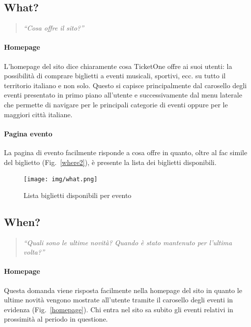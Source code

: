 \subsection{What?}
	\begin{quote}
		\emph{``Cosa offre il sito?''}
	\end{quote}
	\paragraph{Homepage}
		L'homepage del sito dice chiaramente cosa TicketOne offre ai suoi utenti: la possibilità di comprare biglietti a eventi musicali, sportivi, ecc. su tutto il territorio italiano e non solo.
		Questo si capisce principalmente dal carosello degli eventi presentato in primo piano all'utente e successivamente dal menu laterale che permette di navigare per le principali categorie di eventi oppure per le maggiori città italiane.
		
	\paragraph{Pagina evento}
		La pagina di evento facilmente risponde a cosa offre in quanto, oltre al fac simile del biglietto (Fig.~\ref{where2}), è presente la lista dei biglietti disponibili.
		\begin{figure}[hbt]
			\centering
			\texttt{[image: img/what.png]}
			\caption{Lista biglietti disponibili per evento}
			\label{what}
		\end{figure}
	
\subsection{When?}
	\begin{quote}
		\emph{``Quali sono le ultime novità? Quando è stato mantenuto per l'ultima volta?''}
	\end{quote}
	\paragraph{Homepage}
		Questa domanda viene risposta facilmente nella homepage del sito in quanto le ultime novità vengono mostrate all'utente tramite il carosello degli eventi in evidenza (Fig.~\ref{homepage}).
		Chi entra nel sito sa subito gli eventi relativi in prossimità al periodo in questione.
